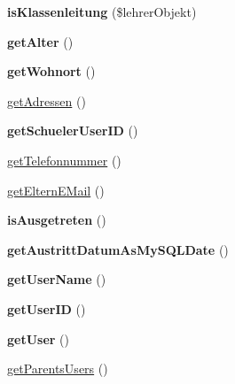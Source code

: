 \begin{DoxyCompactItemize}
\item 
\mbox{\label{classschueler_a99284902bc804fd9ec94c3cdb3b5f259}} 
{\bfseries is\+Klassenleitung} (\$lehrer\+Objekt)
\item 
\mbox{\label{classschueler_abc8236ca0c12adeeade638ea1ab8c4d5}} 
{\bfseries get\+Alter} ()
\item 
\mbox{\label{classschueler_ad332e9727a68727fbe2af9307c40d017}} 
{\bfseries get\+Wohnort} ()
\item 
\mbox{\hyperlink{classschueler_a27dbf35c3d9e8176c93ce2c3128cd161}{get\+Adressen}} ()
\item 
\mbox{\label{classschueler_a22001292ccf19af7fbd86644dacf1c1e}} 
{\bfseries get\+Schueler\+User\+ID} ()
\item 
\mbox{\hyperlink{classschueler_a9cb9ec61630594d551d619d8dddaf973}{get\+Telefonnummer}} ()
\item 
\mbox{\hyperlink{classschueler_a5b6d9b634ce27e6a1de6bad504c2a6ff}{get\+Eltern\+E\+Mail}} ()
\item 
\mbox{\label{classschueler_aad7b5c1780a4fc51cb9f8a4126f1f4b3}} 
{\bfseries is\+Ausgetreten} ()
\item 
\mbox{\label{classschueler_ae99a5435fdb2d873c2e0e28fec01da55}} 
{\bfseries get\+Austritt\+Datum\+As\+My\+S\+Q\+L\+Date} ()
\item 
\mbox{\label{classschueler_a6f45ead40ed7283ed3190bc00d0d31a2}} 
{\bfseries get\+User\+Name} ()
\item 
\mbox{\label{classschueler_a514adc40cb23de187613add29d714d19}} 
{\bfseries get\+User\+ID} ()
\item 
\mbox{\label{classschueler_ac0ec4a7d3a4fb3ebb4bb4d7ad4757819}} 
{\bfseries get\+User} ()
\item 
\mbox{\hyperlink{classschueler_a686353fb18b91baaf9bd0886ad7ce207}{get\+Parents\+Users}} ()
\end{DoxyCompactItemize}
